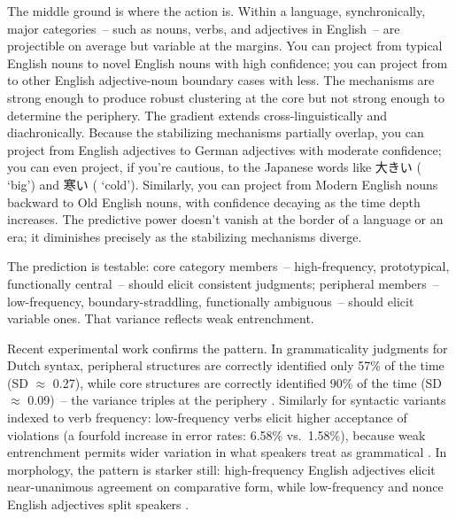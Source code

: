The middle ground is where the action is. Within a language, synchronically, major categories~-- such as nouns, verbs, and adjectives in English~-- are projectible on average but variable at the margins. You can project from typical English nouns to novel English nouns with high confidence; you can project from  to other English adjective-noun boundary cases with less. The mechanisms are strong enough to produce robust clustering at the core but not strong enough to determine the periphery. The gradient extends cross-linguistically and diachronically. Because the stabilizing mechanisms partially overlap, you can project from English adjectives to German adjectives with moderate confidence; you can even project, if you're cautious, to the Japanese words like 大きい ( `big') and 寒い ( `cold'). Similarly, you can project from Modern English nouns backward to Old English nouns, with confidence decaying as the time depth increases. The predictive power doesn't vanish at the border of a language or an era; it diminishes precisely as the stabilizing mechanisms diverge.

The prediction is testable: core category members~-- high-frequency, prototypical, functionally central~-- should elicit consistent judgments; peripheral members~-- low-frequency, boundary-straddling, functionally ambiguous~-- should elicit variable ones. That variance reflects weak entrenchment.

Recent experimental work confirms the pattern. In grammaticality judgments for Dutch syntax, peripheral structures are correctly identified only 57\% of the time (SD $\approx$ 0.27), while core structures are correctly identified 90\% of the time (SD $\approx$ 0.09)~-- the variance triples at the periphery \citep[Table~2]{favier2021}. Similarly for syntactic variants indexed to verb frequency: low-frequency verbs elicit higher acceptance of violations (a fourfold increase in error rates: 6.58\% vs.\ 1.58\%), because weak entrenchment permits wider variation in what speakers treat as grammatical \citep{sassenhagen2018}. In morphology, the pattern is starker still: high-frequency English adjectives elicit near-unanimous agreement on comparative form, while low-frequency and nonce English adjectives split speakers \citep{grazianoking2005}.

